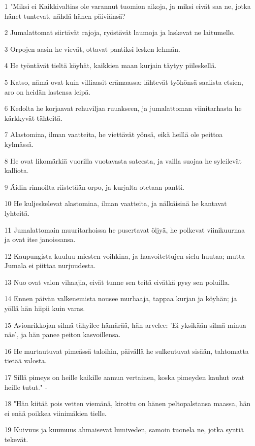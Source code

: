 \par 1 "Miksi ei Kaikkivaltias ole varannut tuomion aikoja, ja miksi eivät saa ne, jotka hänet tuntevat, nähdä hänen päiviänsä?
\par 2 Jumalattomat siirtävät rajoja, ryöstävät laumoja ja laskevat ne laitumelle.
\par 3 Orpojen aasin he vievät, ottavat pantiksi lesken lehmän.
\par 4 He työntävät tieltä köyhät, kaikkien maan kurjain täytyy piileskellä.
\par 5 Katso, nämä ovat kuin villiaasit erämaassa: lähtevät työhönsä saalista etsien, aro on heidän lastensa leipä.
\par 6 Kedolta he korjaavat rehuviljaa ruuakseen, ja jumalattoman viinitarhasta he kärkkyvät tähteitä.
\par 7 Alastomina, ilman vaatteita, he viettävät yönsä, eikä heillä ole peittoa kylmässä.
\par 8 He ovat likomärkiä vuorilla vuotavasta sateesta, ja vailla suojaa he syleilevät kalliota.
\par 9 Äidin rinnoilta riistetään orpo, ja kurjalta otetaan pantti.
\par 10 He kuljeskelevat alastomina, ilman vaatteita, ja nälkäisinä he kantavat lyhteitä.
\par 11 Jumalattomain muuritarhoissa he pusertavat öljyä, he polkevat viinikuurnaa ja ovat itse janoissansa.
\par 12 Kaupungista kuuluu miesten voihkina, ja haavoitettujen sielu huutaa; mutta Jumala ei piittaa nurjuudesta.
\par 13 Nuo ovat valon vihaajia, eivät tunne sen teitä eivätkä pysy sen poluilla.
\par 14 Ennen päivän valkenemista nousee murhaaja, tappaa kurjan ja köyhän; ja yöllä hän hiipii kuin varas.
\par 15 Avionrikkojan silmä tähyilee hämärää, hän arvelee: 'Ei yksikään silmä minua näe', ja hän panee peiton kasvoillensa.
\par 16 He murtautuvat pimeässä taloihin, päivällä he sulkeutuvat sisään, tahtomatta tietää valosta.
\par 17 Sillä pimeys on heille kaikille aamun vertainen, koska pimeyden kauhut ovat heille tutut." -
\par 18 "Hän kiitää pois vetten viemänä, kirottu on hänen peltopalstansa maassa, hän ei enää poikkea viinimäkien tielle.
\par 19 Kuivuus ja kuumuus ahmaisevat lumiveden, samoin tuonela ne, jotka syntiä tekevät.
